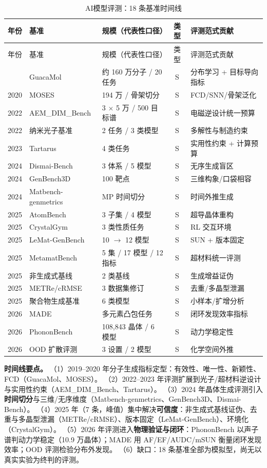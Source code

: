 \documentclass[11pt,a4paper]{ctexart}
\begin{document}
\begin{longtable}{@{}p{1.1cm}p{3.6cm}p{4.3cm}cp{5.4cm}@{}}
\caption{AI模型评测：18 条基准时间线}\\
\toprule
年份 & 基准 & 规模（代表性口径） & 类型 & 评测范式贡献 \\
\midrule
\endfirsthead
\toprule
年份 & 基准 & 规模（代表性口径） & 类型 & 评测范式贡献 \\
\midrule
\endhead
\bottomrule
\endfoot
2019 & GuacaMol & 约 160 万分子 / 20 任务 & S & 分布学习 + 目标导向指标 \\
2020 & MOSES & 194 万 / 骨架切分 & S & FCD/SNN/骨架泛化 \\
2022 & AEM\_DIM\_Bench & 3 $\times$ 5 万 / 500 目标谱 & S & 电磁逆设计统一预算 \\
2022 & 纳米光子基准 & 2 任务 / 3 类模型 & S & 多解性与制造约束 \\
2023 & Tartarus & 4 类任务 & S & 实用性约束 + 计算预算 \\
2024 & Dismai-Bench & 3 体系 / 5 模型 & S & 无序生成盲区 \\
2024 & GenBench3D & 100 靶点 & S & 三维构象/口袋相容 \\
2024 & Matbench-genmetrics & MP 时间切分 & S & 时间外推生成 \\
2025 & AtomBench & 3 子集 / 4 模型 & S & 超导晶体重构 \\
2025 & CrystalGym & 3 类性质任务 & S & RL 交互环境 \\
2025 & LeMat-GenBench & 10 $\to$ 12 模型 & S & SUN + 版本固定 \\
2025 & MetamatBench & 5 集 / 17 模型 / 12 指标 & S & 超材料统一评测 \\
2025 & 非生成式基线 & 2 类基线 & S & 生成增益证伪 \\
2025 & METRe/cRMSE & 3 数据集修订 & S & 去重/多晶型泄漏 \\
2025 & 聚合物生成基准 & 6 类模型 & S & 小样本/扩增分析 \\
2026 & MADE & 多元素凸包任务 & S & 闭环发现效率指标 \\
2026 & PhononBench & 108,843 晶体 / 6 模型 & S & 动力学稳定性 \\
2026 & OOD 扩散评测 & 3 设置 / 2 模型 & S & 化学空间外推 \\
\end{longtable}

\textbf{时间线要点。}
（1）2019--2020 年分子生成指标定型：有效性、唯一性、新颖性、FCD（GuacaMol、MOSES）。
（2）2022--2023 年评测扩展到光子/超材料逆设计与实用性约束（AEM\_DIM\_Bench、Tartarus）。
（3）2024 年晶体生成评测引入\textbf{时间切分}与三维/无序维度（Matbench-genmetrics、GenBench3D、Dismai-Bench）。
（4）2025 年（7 条，峰值）集中解决\textbf{可信度}：非生成式基线证伪、去重与多晶型泄漏（METRe/cRMSE）、版本固定（LeMat-GenBench）、环境化（CrystalGym）。
（5）2026 年评测进入\textbf{物理验证与闭环}：PhononBench 以声子谱判动力学稳定（10.9 万晶体）；MADE 用 AF/EF/AUDC/mSUN 衡量闭环发现效率；OOD 评测检验分布外发现。
（6）缺口：18 条基准全部为模拟型，尚无以真实实验为终判的评测。
\end{document}
